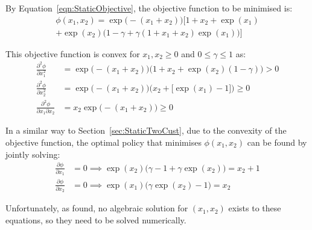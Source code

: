 By Equation~\ref{eqn:StaticObjective}, the objective function to be minimised is:
\begin{multline}
	\phi (x_{1}, x_{2}) = \exp \Big( - (x_{1} + x_{2}) \Big) \Bigg[ 1 + x_{2} + \exp (x_{1}) \\
	+ \exp (x_{2}) \Big( 1 - \gamma + \gamma (1 + x_{1} + x_{2}) \exp (x_{1}) \Big) \Bigg]
\end{multline}

This objective function is convex for $x_{1}, x_{2} \geq 0$ and $0 \leq \gamma \leq 1$ as:
\begin{align}
	\frac{\partial^{2} \phi}{\partial x_{1}^{2}} & = \exp \Big( - (x_{1} + x_{2}) \Big) \Big( 1 + x_{2} + \exp (x_{2}) (1 - \gamma) \Big) > 0 \\
	\frac{\partial^{2} \phi}{\partial x_{2}^{2}} & = \exp \Big( - (x_{1} + x_{2}) \Big) \Big( x_{2} + \big[ \exp (x_{1}) - 1 \big] \Big) \geq 0 \\
	\frac{\partial^{2} \phi}{\partial x_{1} \partial x_{2}} & = x_{2} \exp \Big( - (x_{1} + x_{2}) \Big) \geq 0
\end{align}

In a similar way to Section~\ref{sec:StaticTwoCust}, due to the convexity of the objective function, the optimal policy that minimises $\phi (x_{1}, x_{2})$ can be found by jointly solving:
\begin{align}
	\frac{\partial \phi}{\partial x_{1}} & = 0 \implies \exp (x_{2}) \Big( \gamma - 1 + \gamma \exp (x_{2}) \Big) = x_{2} + 1 \\
	\frac{\partial \phi}{\partial x_{2}} & = 0 \implies \exp (x_{1}) \Big( \gamma \exp (x_{2}) - 1 \Big) = x_{2}
\end{align}

Unfortunately, as \citet{Pegden} found, no algebraic solution for $(x_{1}, x_{2})$ exists to these equations, so they need to be solved numerically.

